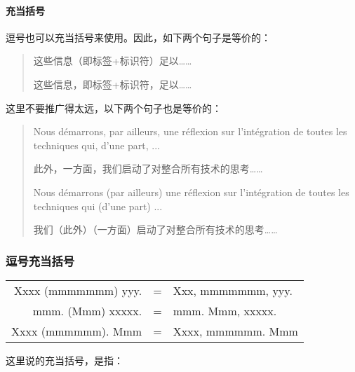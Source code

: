 \paragraph{充当括号}

逗号也可以充当括号来使用。因此，如下两个句子是等价的：

\begin{quote}
    这些信息（即标签+标识符）足以……

    这些信息，即标签+标识符，足以……
\end{quote}

这里不要推广得太远，以下两个句子也是等价的：

\begin{quote}
    Nous démarrons, par ailleurs, une réflexion sur l'intégration de toutes les techniques qui, d'une part, ...

    \begin{bil}
        此外，一方面，我们启动了对整合所有技术的思考……
    \end{bil}

    Nous démarrons (par ailleurs) une réflexion sur l'intégration de toutes les techniques qui (d'une part) ...

    \begin{bil}
        我们（此外）（一方面）启动了对整合所有技术的思考……
    \end{bil}
\end{quote}

\begin{mdframed}
    \subsubsection*{逗号充当括号}

    \begin{tabular}{rcl}
        Xxxx (mmmmmmm) yyy. & = & Xxx, mmmmmmm, yyy.\\
        mmm. (Mmm) xxxxx. & = & mmm. Mmm, xxxxx.\\
        Xxxx (mmmmmm). Mmm & = & Xxxx, mmmmmm. Mmm
    \end{tabular}
\end{mdframed}

这里说的充当括号，是指：

